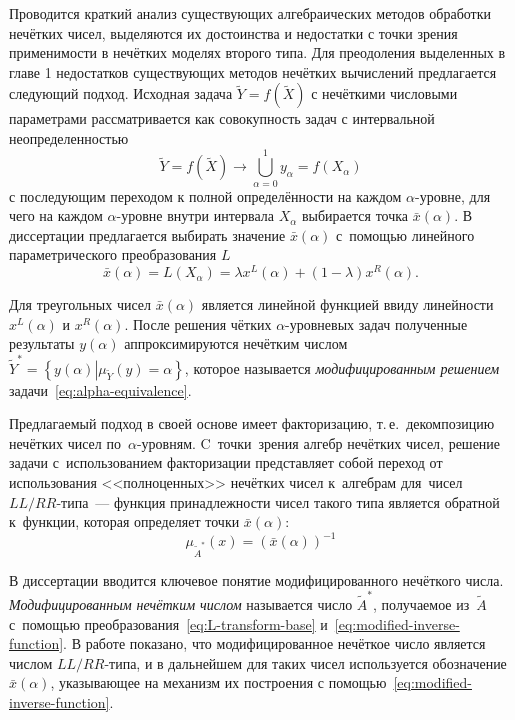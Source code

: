 Проводится краткий анализ существующих алгебраических методов обработки нечётких чисел, выделяются их достоинства и недостатки с точки зрения применимости в нечётких моделях второго типа. Для преодоления выделенных в главе 1 недостатков существующих методов нечётких вычислений предлагается следующий подход. Исходная задача $\tilde{Y}=f\left( {\tilde{X}} \right)$ с нечёткими числовыми параметрами рассматривается как совокупность задач с интервальной неопределенностью
\begin{equation}
\label{eq:alpha-equivalence}
	\tilde{Y} = f\left( \tilde X \right)\to \bigcup\limits_{\alpha =0}^{1}{y_\alpha}=f\left( X_\alpha \right)
\end{equation}
с последующим переходом к полной определённости на каждом $\alpha$-уровне, для чего на каждом $\alpha$-уровне внутри интервала $X_\alpha$ выбирается точка $\bar{x}\left( \alpha  \right)$. В диссертации предлагается выбирать значение $\bar{x}\left( \alpha  \right)$ с~помощью линейного параметрического преобразования $L$
\begin{equation}
  \label{eq:L-transform-base}
  \bar{x}\left( \alpha  \right)=L\left( X_\alpha \right)=\lambda x^L \left( \alpha  \right)+\left( 1-\lambda  \right) x^R \left( \alpha  \right).
\end{equation}

Для треугольных чисел $\bar{x}\left( \alpha  \right)$ является линейной функцией ввиду линейности $x^L\left( \alpha  \right)$ и $x^R\left( \alpha  \right)$. После решения чётких $\alpha $-уровневых задач полученные результаты $y\left( \alpha  \right)$ аппроксимируются нечётким числом $\tilde Y^{*}=\left\{ y(\alpha )\left| \mu_{\tilde Y}(y)=\alpha \right. \right\}$, которое называется \textit{модифицированным решением} задачи~\eqref{eq:alpha-equivalence}.

Предлагаемый подход в своей основе имеет факторизацию, т.\,е.~декомпозицию нечётких чисел по~$\alpha$-уровням. C~точки~зрения алгебр нечётких чисел, решение задачи с~использованием факторизации представляет собой переход от использования <<полноценных>> нечётких чисел к~алгебрам для~чисел $LL/RR$-типа~--- функция принадлежности чисел такого типа является обратной к~функции, которая определяет точки $\bar{x}\left(\alpha \right)$:
\begin{equation}
\label{eq:modified-inverse-function}
  \mu_{\tilde A^{*}}\left( x \right)={\left( \bar{x}\left( \alpha  \right) \right)}^{-1}
\end{equation}

В диссертации вводится ключевое понятие модифицированного нечёткого числа. \textit{Модифицированным нечётким числом} называется число $\tilde A^{*}$, получаемое из~$\tilde{A}$ с~помощью преобразования~\eqref{eq:L-transform-base} и~\eqref{eq:modified-inverse-function}. В работе показано, что модифицированное нечёткое число является числом $LL/RR$-типа, и в дальнейшем для таких чисел используется обозначение $\bar{x}\left( \alpha  \right)$, указывающее на механизм их построения с помощью~\eqref{eq:modified-inverse-function}.

